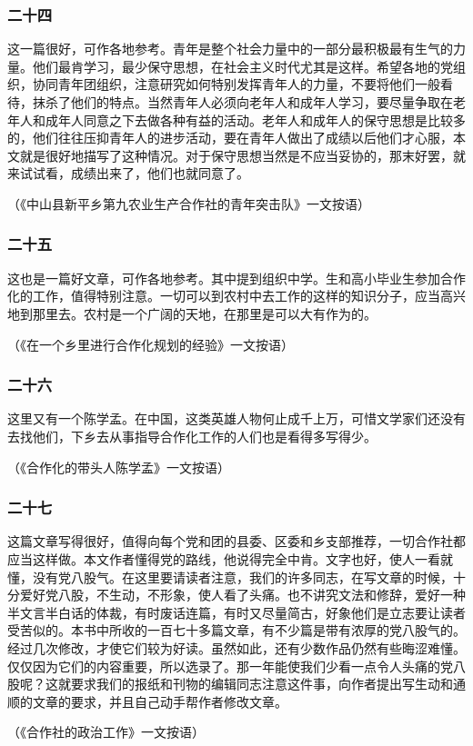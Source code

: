\documentclass[cn,11pt,chinese]{elegantbook}
\def\myformat#1{\hfil\hfil #1}
\begin{document}
\subsubsection*{\myformat{二十四}}
这一篇很好，可作各地参考。青年是整个社会力量中的一部分最积极最有生气的力量。他们最肯学习，最少保守思想，在社会主义时代尤其是这样。希望各地的党组织，协同青年团组织，注意研究如何特别发挥青年人的力量，不要将他们一般看待，抹杀了他们的特点。当然青年人必须向老年人和成年人学习，要尽量争取在老年人和成年人同意之下去做各种有益的活动。老年人和成年人的保守思想是比较多的，他们往往压抑青年人的进步活动，要在青年人做出了成绩以后他们才心服，本文就是很好地描写了这种情况。对于保守思想当然是不应当妥协的，那末好罢，就来试试看，成绩出来了，他们也就同意了。\\
\begin{flushright}（《中山县新平乡第九农业生产合作社的青年突击队》一文按语）\end{flushright}
\subsubsection*{\myformat{二十五}}
这也是一篇好文章，可作各地参考。其中提到组织中学。生和高小毕业生参加合作化的工作，值得特别注意。一切可以到农村中去工作的这样的知识分子，应当高兴地到那里去。农村是一个广阔的天地，在那里是可以大有作为的。\\
\begin{flushright}（《在一个乡里进行合作化规划的经验》一文按语）\end{flushright}
\subsubsection*{\myformat{二十六}}
这里又有一个陈学孟。在中国，这类英雄人物何止成千上万，可惜文学家们还没有去找他们，下乡去从事指导合作化工作的人们也是看得多写得少。\\
\begin{flushright}（《合作化的带头人陈学孟》一文按语）\end{flushright}
\subsubsection*{\myformat{二十七}}
这篇文章写得很好，值得向每个党和团的县委、区委和乡支部推荐，一切合作社都应当这样做。本文作者懂得党的路线，他说得完全中肯。文字也好，使人一看就懂，没有党八股气。在这里要请读者注意，我们的许多同志，在写文章的时候，十分爱好党八股，不生动，不形象，使人看了头痛。也不讲究文法和修辞，爱好一种半文言半白话的体裁，有时废话连篇，有时又尽量简古，好象他们是立志要让读者受苦似的。本书中所收的一百七十多篇文章，有不少篇是带有浓厚的党八股气的。经过几次修改，才使它们较为好读。虽然如此，还有少数作品仍然有些晦涩难懂。仅仅因为它们的内容重要，所以选录了。那一年能使我们少看一点令人头痛的党八股呢？这就要求我们的报纸和刊物的编辑同志注意这件事，向作者提出写生动和通顺的文章的要求，并且自己动手帮作者修改文章。\\
\begin{flushright}（《合作社的政治工作》一文按语）\end{flushright}
\end{document}
